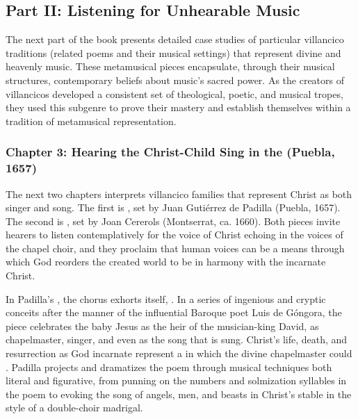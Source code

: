 \documentclass{vcbook-proposal}
\begin{document}
\subsection{Part II: Listening for Unhearable Music}

The next part of the book presents detailed case studies of particular 
villancico traditions (related poems and their musical settings) that represent 
divine and heavenly music.
These metamusical pieces encapsulate, through their musical structures, 
contemporary beliefs about music's sacred power.
As the creators of villancicos developed a consistent set of theological, 
poetic, and musical tropes, they used this subgenre to prove their mastery and 
establish themselves within a tradition of metamusical representation.

\subsubsection{Chapter 3: Hearing the Christ-Child Sing in the  (Puebla, 1657)}

The next two chapters interprets villancico families that represent Christ as
both singer and song.
The first is , set by Juan Gutiérrez de
Padilla (Puebla, 1657).
The second is , set by Joan 
Cererols (Montserrat, ca. 1660).
Both pieces invite hearers to listen contemplatively for the voice of Christ
echoing in the voices of the chapel choir, and they proclaim that human voices
can be a means through which God reorders the created world to be in harmony
with the incarnate Christ.

In Padilla's , the chorus exhorts itself, .
In a series of ingenious and cryptic conceits after the manner of the
influential Baroque poet Luis de Góngora, the piece celebrates the baby Jesus as
the heir of the musician-king David, as chapelmaster, singer, and even as the
song that is sung.
Christ's life, death, and resurrection as God incarnate represent a 
 in which the divine chapelmaster could .
Padilla projects and dramatizes the poem through musical techniques both literal
and figurative, from punning on the numbers and solmization syllables in the
poem to evoking the song of angels, men, and beasts in Christ's stable in the
style of a double-choir madrigal.
\end{document}
